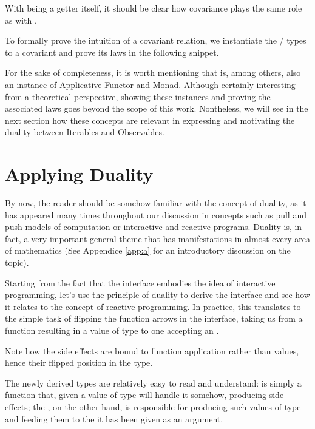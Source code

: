 With  being a getter itself, it should be clear how covariance plays the same role as with .

To formally prove the intuition of a covariant relation, we instantiate the / types to a covariant  and prove its laws in the following snippet.


For the sake of completeness, it is worth mentioning that  is, among others, also an instance of Applicative Functor and Monad. Although certainly interesting from a theoretical perspective, showing these instances and proving the associated laws goes beyond the scope of this work. Nontheless, we will see in the next section how these concepts are relevant in expressing and motivating the duality between Iterables and Observables.

\section{Applying Duality}
\label{sec:applyingduality}

By now, the reader should be somehow familiar with the concept of duality, as it has appeared many times throughout our discussion in concepts such as pull and push models of computation or interactive and reactive programs. Duality is, in fact, a very important general theme that has manifestations in almost every area of mathematics\cite{gowers2010princeton} (See Appendice \ref{app:a} for an introductory discussion on the topic). 

Starting from the fact that the  interface embodies the idea of interactive programming, let's use the principle of duality to derive the  interface and see how it relates to the concept of reactive programming. In practice, this translates to the simple task of flipping the function arrows in the  interface, taking us from a function resulting in a value of type  to one accepting an .


Note how the side effects are bound to function application rather than values, hence their flipped position in the  type.

The newly derived types are relatively easy to read and understand:  is simply a function that, given a value of type  will handle it somehow, producing side effects; the , on the other hand, is responsible for producing such values of type  and feeding them to the  it has been given as an argument.

